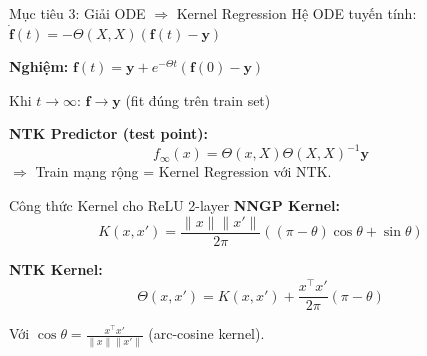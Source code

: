 \begin{frame}{Mục tiêu 3: Giải ODE $\Rightarrow$ Kernel Regression}
  Hệ ODE tuyến tính: $\dot{\mathbf{f}}(t) = -\Theta(X,X)(\mathbf{f}(t) - \mathbf{y})$
  
  \vspace{0.3cm}
  \textbf{Nghiệm:} $\mathbf{f}(t) = \mathbf{y} + e^{-\Theta t}(\mathbf{f}(0) - \mathbf{y})$
  
  Khi $t \to \infty$: $\mathbf{f} \to \mathbf{y}$ (fit đúng trên train set)
  
  \vspace{0.3cm}
  \textbf{NTK Predictor (test point):}
  \[
    \boxed{f_\infty(x) = \Theta(x,X)\Theta(X,X)^{-1}\mathbf{y}}
  \]
  $\Rightarrow$ Train mạng rộng = Kernel Regression với NTK.
\end{frame}

\begin{frame}{Công thức Kernel cho ReLU 2-layer}
  \textbf{NNGP Kernel:}
  \[
    K(x,x') = \frac{\|x\|\|x'\|}{2\pi}\left((\pi-\theta)\cos\theta + \sin\theta\right)
  \]
  
  \textbf{NTK Kernel:}
  \[
    \Theta(x,x') = K(x,x') + \frac{x^\top x'}{2\pi}(\pi-\theta)
  \]
  
  Với $\cos\theta = \frac{x^\top x'}{\|x\|\|x'\|}$ (arc-cosine kernel).
\end{frame}
